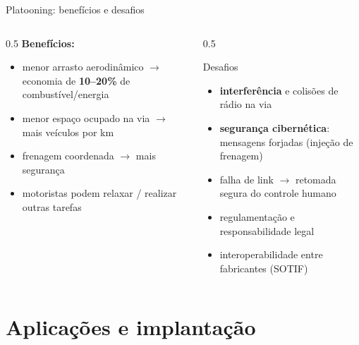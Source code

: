 \documentclass[aspectratio=169,11pt]{beamer}
\begin{document}
\begin{frame}{Platooning: benefícios e desafios}
  \begin{columns}
    \begin{column}{0.5\textwidth}
      \textbf{Benefícios:}
      \begin{itemize}
        \item menor arrasto aerodinâmico $\rightarrow$ economia de \textbf{10--20\%} de combustível/energia
        \item menor espaço ocupado na via $\rightarrow$ mais veículos por km
        \item frenagem coordenada $\rightarrow$ mais segurança
        \item motoristas podem relaxar / realizar outras tarefas
      \end{itemize}
    \end{column}
    \begin{column}{0.5\textwidth}
      \begin{alertblock}{Desafios}
        \begin{itemize}
          \item \textbf{interferência} e colisões de rádio na via
          \item \textbf{segurança cibernética}: mensagens forjadas (injeção de frenagem)
          \item falha de link $\rightarrow$ retomada segura do controle humano
          \item regulamentação e responsabilidade legal
          \item interoperabilidade entre fabricantes (SOTIF)
        \end{itemize}
      \end{alertblock}
    \end{column}
  \end{columns}
\end{frame}

\section{Aplicações e implantação}
\end{document}
